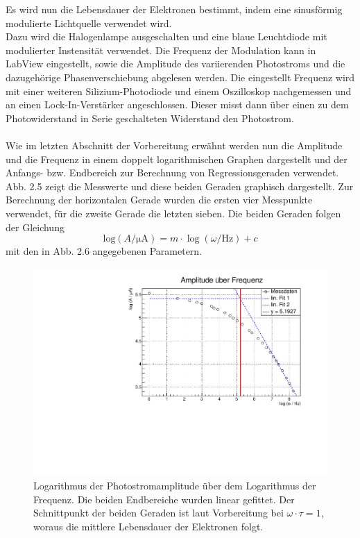 Es wird nun die Lebensdauer der Elektronen bestimmt, indem eine sinusförmig modulierte Lichtquelle verwendet wird. \\
Dazu wird die Halogenlampe ausgeschalten und eine blaue Leuchtdiode mit modulierter Instensität verwendet. Die Frequenz der Modulation kann in LabView eingestellt, sowie die Amplitude des variierenden Photostroms und die dazugehörige Phasenverschiebung abgelesen werden. Die eingestellt Frequenz wird mit einer weiteren Silizium-Photodiode und einem Oszilloskop nachgemessen und an einen Lock-In-Verstärker angeschlossen. Dieser misst dann über einen zu dem Photowiderstand in Serie geschalteten Widerstand den Photostrom. \\
\\
Wie im letzten Abschnitt der Vorbereitung erwähnt werden nun die Amplitude und die Frequenz in einem doppelt logarithmischen Graphen dargestellt und der Anfangs- bzw. Endbereich zur Berechnung von Regressionsgeraden verwendet. \\
Abb. 2.5 zeigt die Messwerte und diese beiden Geraden graphisch dargestellt. Zur Berechnung der horizontalen Gerade wurden die ersten vier Messpunkte verwendet, für die zweite Gerade die letzten sieben. 
Die beiden Geraden folgen der Gleichung 
$$\mathrm{log} (A / \mathrm{\mu A}) = m \cdot \log(\omega / \mathrm{Hz}) + c$$
mit den in Abb. 2.6 angegebenen Parametern. \\

\begin{figure}[h]
\label{A4_reg}
\centering
\includegraphics[scale=0.45]{../A4/A4_2fits.pdf}
\caption{Logarithmus der Photostromamplitude über dem Logarithmus der Frequenz. Die beiden Endbereiche wurden linear gefittet. Der Schnittpunkt der beiden Geraden ist laut Vorbereitung bei $\omega \cdot \tau = 1$, woraus die mittlere Lebensdauer der Elektronen folgt.}
\end{figure}

